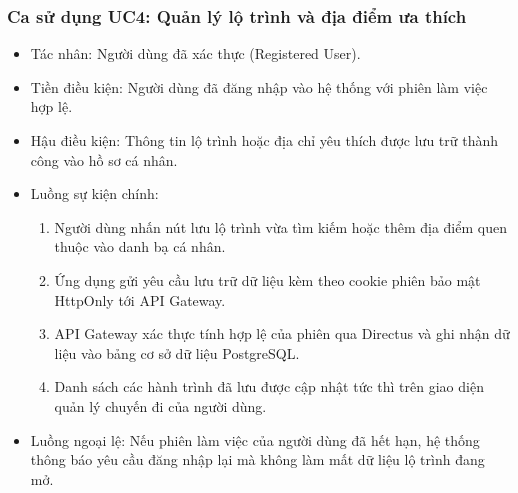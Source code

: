 \subsubsection{Ca sử dụng UC4: Quản lý lộ trình và địa điểm ưa thích}
\begin{itemize}
    \item Tác nhân: Người dùng đã xác thực (Registered User).
    \item Tiền điều kiện: Người dùng đã đăng nhập vào hệ thống với phiên làm việc hợp lệ.
    \item Hậu điều kiện: Thông tin lộ trình hoặc địa chỉ yêu thích được lưu trữ thành công vào hồ sơ cá nhân.
    \item Luồng sự kiện chính:
    \begin{enumerate}
        \item Người dùng nhấn nút lưu lộ trình vừa tìm kiếm hoặc thêm địa điểm quen thuộc vào danh bạ cá nhân.
        \item Ứng dụng gửi yêu cầu lưu trữ dữ liệu kèm theo cookie phiên bảo mật HttpOnly tới API Gateway.
        \item API Gateway xác thực tính hợp lệ của phiên qua Directus và ghi nhận dữ liệu vào bảng cơ sở dữ liệu PostgreSQL.
        \item Danh sách các hành trình đã lưu được cập nhật tức thì trên giao diện quản lý chuyến đi của người dùng.
    \end{enumerate}
    \item Luồng ngoại lệ: Nếu phiên làm việc của người dùng đã hết hạn, hệ thống thông báo yêu cầu đăng nhập lại mà không làm mất dữ liệu lộ trình đang mở.
\end{itemize}

